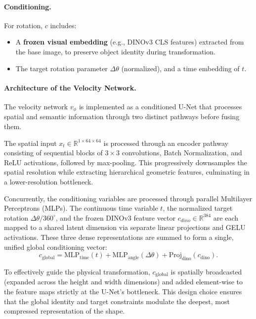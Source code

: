 \documentclass{l4proj}
\begin{document}
\paragraph{Conditioning.}
For rotation, $c$ includes:
\begin{itemize}
    \item A \textbf{frozen visual embedding} (e.g., DINOv3 CLS features) extracted from the base image, to preserve object identity during transformation.
    \item The target rotation parameter $\Delta\theta$ (normalized), and a time embedding of $t$.
\end{itemize}

\paragraph{Architecture of the Velocity Network.}
The velocity network $v_\phi$ is implemented as a conditioned U-Net that processes spatial and semantic information through two distinct pathways before fusing them.

The spatial input $x_t \in \mathbb{R}^{1 \times 64 \times 64}$ is processed through an encoder pathway consisting of sequential blocks of $3 \times 3$ convolutions, Batch Normalization, and ReLU activations, followed by max-pooling. This progressively downsamples the spatial resolution while extracting hierarchical geometric features, culminating in a lower-resolution bottleneck.

Concurrently, the conditioning variables are processed through parallel Multilayer Perceptrons (MLPs). The continuous time variable $t$, the normalized target rotation $\Delta\theta / 360^{\circ}$, and the frozen DINOv3 feature vector $c_{dino} \in \mathbb{R}^{384}$ are each mapped to a shared latent dimension via separate linear projections and GELU activations. These three dense representations are summed to form a single, unified global conditioning vector:
\begin{equation}
    c_{\mathrm{global}} = \mathrm{MLP}_{\mathrm{time}}(t) + \mathrm{MLP}_{\mathrm{angle}}(\Delta\theta) + \mathrm{Proj}_{\mathrm{dino}}(c_{\mathrm{dino}}).
\end{equation}

To effectively guide the physical transformation, $c_{\mathrm{global}}$ is spatially broadcasted (expanded across the height and width dimensions) and added element-wise to the feature maps strictly at the U-Net's bottleneck. This design choice ensures that the global identity and target constraints modulate the deepest, most compressed representation of the shape.
\end{document}
